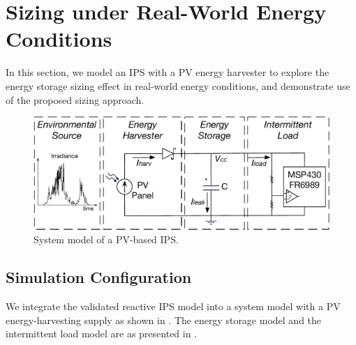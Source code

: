 \section{Sizing under Real-World Energy Conditions} \label{sec:c4_demo}

In this section, we model an IPS with a PV energy harvester to explore the energy storage sizing effect in real-world energy conditions, and demonstrate use of the proposed sizing approach. 

\begin{figure}
    \centering
    \includegraphics[width=\columnwidth]{ch4_sizingapproach/figures/solarmodel4}
    \caption{System model of a PV-based IPS.}
    \label{fig:Model}
\end{figure}

\subsection{Simulation Configuration}

We integrate the validated reactive IPS model into a system model with a PV energy-harvesting supply as shown in . 
The energy storage model and the intermittent load model are as presented in . 


